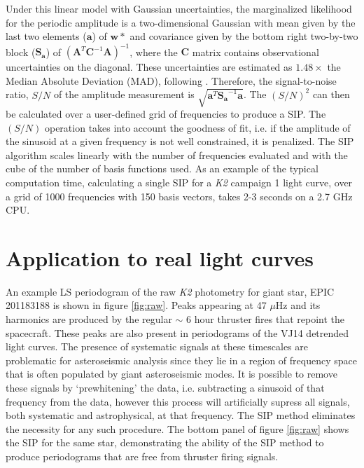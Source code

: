 Under this linear model with Gaussian uncertainties, the marginalized
likelihood for the periodic amplitude is a two-dimensional Gaussian with mean
given by the last two elements ($\mathbf{a}$) of $\mathbf{w}*$ and covariance
given by the bottom right two-by-two block ($\mathbf{S_a}$) of
$(\mathbf{A}^T \mathbf{C}^{-1} \mathbf{A})^{-1}$, where the $\mathbf{C}$
matrix contains observational uncertainties on the diagonal.
These uncertainties are estimated as $1.48 \times$ the Median Absolute
Deviation (MAD), following \citet{Aigrain2015}.
Therefore, the signal-to-noise ratio, $S/N$ of the amplitude measurement is
$\sqrt{\mathbf{a}^T \mathbf{S_a}^{-1} \mathbf{a}}$.
The $(S/N)^2$ can then be calculated over a user-defined grid of frequencies
to produce a SIP.
The $(S/N)$ operation takes into account the goodness of fit, i.e. if the
amplitude of the sinusoid at a given frequency is not well constrained,
it is penalized.
The SIP algorithm scales linearly with the number of frequencies evaluated
and with the cube of the number of basis functions used.
As an example of the typical computation time, calculating a single SIP for a
{\it K2} campaign 1 light curve, over a grid of 1000 frequencies with 150
basis vectors, takes 2-3 seconds on a 2.7 GHz CPU.

\section{Application to real light curves}
\label{section:rotation}

An example LS periodogram of the raw {\it K2} photometry
for giant star, EPIC 201183188 is shown in figure \ref{fig:raw}.
Peaks appearing at 47 $\mu$Hz and its harmonics are produced by the regular
$\sim$ 6 hour thruster fires that repoint the spacecraft.
These peaks are also present in periodograms of the VJ14 detrended light
curves.
The presence of systematic signals at these timescales are problematic for
asteroseismic analysis since they lie in a region of frequency space
that is often populated by giant asteroseismic modes.
It is possible to remove these signals by `prewhitening' the data, i.e.
subtracting a sinusoid of that frequency from the data, however this process
will artificially supress all signals, both systematic and astrophysical, at
that frequency.
The SIP method eliminates the necessity for any such procedure.
The bottom panel of figure \ref{fig:raw} shows the SIP for the same star,
demonstrating the ability of the SIP method to produce periodograms that
are free from thruster firing signals.

